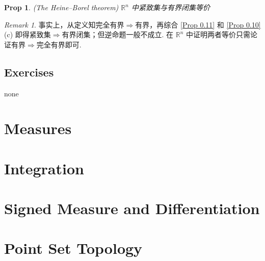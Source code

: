 \documentclass[hidelinks]{article}
\theoremstyle{definition}
\theoremstyle{plain}
\newtheorem{proposition}[theorem]{Prop}
\theoremstyle{remark}
\newtheorem*{remark}{Remark}
\begin{document}
\begin{proposition}\label{Prop 0.15}(The Heine–Borel theorem)
$\mathbb{R}^n$ 中紧致集与有界闭集等价
\end{proposition}

\begin{remark}
事实上，从定义知完全有界$\Rightarrow$有界，再综合 \autoref{Prop 0.11} 和 \autoref{Prop 0.10} (c) 即得紧致集$\Rightarrow$有界闭集；但逆命题一般不成立. 在 $\mathbb{R}^n$ 中证明两者等价只需论证有界$\Rightarrow$完全有界即可.
\end{remark}


\subsection{Exercises}
none

\newpage



\section{Measures}
\newpage
\section{Integration}
\newpage
\section{Signed Measure and Differentiation}
\newpage




\section{Point Set Topology}
\end{document}
